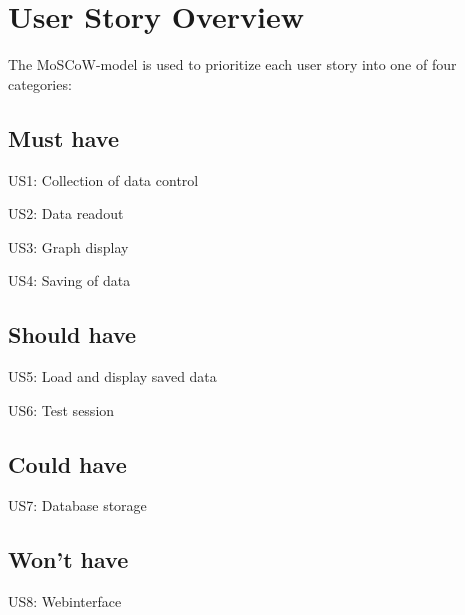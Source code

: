 \section{User Story Overview}
\label{sec:UserStoryOverview}

The MoSCoW-model is used to prioritize each user story into one of four categories:

\subsection{Must have}

US1: Collection of data control

US2: Data readout

US3: Graph display

US4: Saving of data

\subsection{Should have}

US5: Load and display saved data

US6: Test session

\subsection{Could have}

US7: Database storage

\subsection{Won't have}

US8: Webinterface